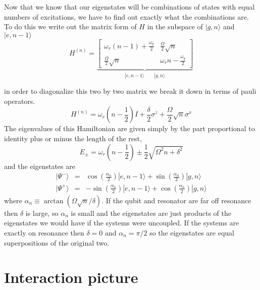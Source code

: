 \documentclass[twocolumn]{article}
\begin{document}
Now that we know that our eigenstates will be combinations of states
with equal numbers of excitations, we have to find out exactly what
the combinations are. To do this we write out the matrix form of $H$
in the subspace of $|g,n\rangle$ and $|e,n-1\rangle$\[
H^{(n)}=\underbrace{\left[\begin{array}{cc}
\omega_{r}\left(n-1\right)+\frac{\omega_{q}}{2} & \frac{\Omega}{2}\sqrt{n}\\
\frac{\Omega}{2}\sqrt{n} & \omega_{r}n-\frac{\omega_{q}}{2}\end{array}\right]}_{|e,n-1\rangle\qquad|g,n\rangle}\]


in order to diagonalize this two by two matrix we break it down in
terms of pauli operators.\[
H^{(n)}=\omega_{r}\left(n-\frac{1}{2}\right)I+\frac{\delta}{2}\sigma^{z}+\frac{\Omega}{2}\sqrt{n}\sigma^{x}\]
The eigenvalues of this Hamiltonian are given simply by the part proportional
to identity plus or minus the length of the rest,\[
E_{\pm}=\omega_{r}\left(n-\frac{1}{2}\right)\pm\frac{1}{2}\sqrt{\Omega^{2}n+\delta^{2}}\]
and the eigenstates are\begin{eqnarray*}
|\Psi^{-}\rangle & = & \cos\left(\frac{\alpha_{n}}{2}\right)|e,n-1\rangle+\sin\left(\frac{\alpha_{n}}{2}\right)|g,n\rangle\\
|\Psi^{+}\rangle & = & -\sin\left(\frac{\alpha_{n}}{2}\right)|e,n-1\rangle+\cos\left(\frac{\alpha_{n}}{2}\right)|g,n\rangle\end{eqnarray*}
where $\alpha_{n}\equiv\arctan\left(\Omega\sqrt{n}/\delta\right)$.
If the qubit and resonator are far off resonance then $\delta$ is
large, so $\alpha_{n}$ is small and the eigenstates are just products
of the eigenstates we would have if the systems were uncoupled. If
the systems are exactly on resonance then $\delta=0$ and $\alpha_{n}=\pi/2$
so the eigenstates are equal superpositions of the original two.


\section{Interaction picture}
\end{document}
